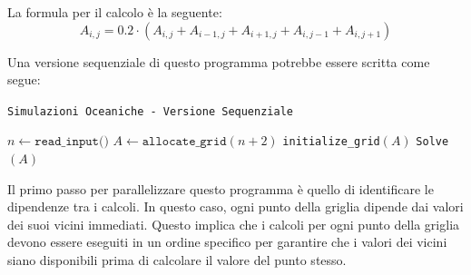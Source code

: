 La formula per il calcolo è la seguente:
\[
A_{i,j} = 0.2 \cdot (A_{i, j} + A_{i-1, j} + A_{i+1, j}
+ A_{i, j-1} + A_{i, j+1})  
\]

\begin{figure}[H]
    \centering
\end{figure}

Una versione sequenziale di questo programma potrebbe
essere scritta come segue:

\begin{algorithm}[H]
    \caption{\texttt{Simulazioni Oceaniche - Versione Sequenziale}}
    \DontPrintSemicolon  
    

    \BlankLine
    $n \gets \texttt{read\_input()}$ \;
    $A \gets \texttt{allocate\_grid}(n + 2)$ \;
    \texttt{initialize\_grid}$(A)$ \;
    \texttt{Solve}$(A)$ \;
    
\end{algorithm}

Il primo passo per parallelizzare questo programma è quello 
di identificare le dipendenze tra i calcoli. In questo caso,
ogni punto della griglia dipende dai valori dei suoi vicini
immediati. Questo implica che i calcoli per ogni punto
della griglia devono essere eseguiti in un ordine specifico
per garantire che i valori dei vicini siano disponibili
prima di calcolare il valore del punto stesso.

